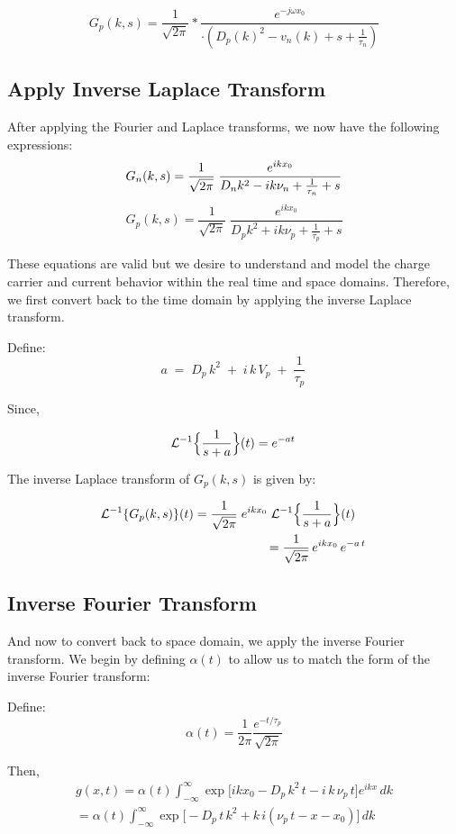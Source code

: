 \documentclass[
  journal,
]{IEEEtran}%
\begin{document}
\[
G_p(k, s) = \frac{1}{\sqrt{2\pi}} * \frac{
e^{-j \omega x_0}}{
\cdot \left(D_p(k)^2
- v_n (k)
+ s
+ \frac{1}{\tau_n}
\right)}
\]

\subsection{Apply Inverse Laplace
Transform}\label{apply-inverse-laplace-transform}

After applying the Fourier and Laplace transforms, we now have the
following expressions: \[
G_n(k,s) = \frac{1}{\sqrt{2\pi}}\;\frac{e^{ikx_0}}{D_n k^2 - i k \nu_n + \frac{1}{\tau_n} + s} \\[1ex]
\] \[
G_p(k,s) = \frac{1}{\sqrt{2\pi}}\;\frac{e^{ikx_0}}{D_p k^2 + i k \nu_p + \frac{1}{\tau_p} + s}
\]

These equations are valid but we desire to understand and model the
charge carrier and current behavior within the real time and space
domains. Therefore, we first convert back to the time domain by applying
the inverse Laplace transform.

Define: \[
a \;=\; D_p\,k^2 \;+\; i\,k\,V_p \;+\; \frac1{\tau_p}\,
\]

Since,

\[
\mathcal{L}^{-1}\Bigl\{\frac1{s+a}\Bigr\}(t)=e^{-a t}\,
\]

The inverse Laplace transform of \(G_p(k,s)\) is given by:

\[
\begin{multlined}
\mathcal{L}^{-1}\{G_p(k,s)\}(t)
=\frac{1}{\sqrt{2\pi}}\;e^{ikx_0}\;\mathcal{L}^{-1}\Bigl\{\frac1{s+a}\Bigr\}(t)
\\
=\frac{1}{\sqrt{2\pi}}\,e^{ikx_0}\,e^{-a\,t}\,
\end{multlined}
\]

\subsection{Inverse Fourier Transform}\label{inverse-fourier-transform}

And now to convert back to space domain, we apply the inverse Fourier
transform. We begin by defining \(\alpha(t)\) to allow us to match the
form of the inverse Fourier transform:

Define: \[
\alpha(t) = \frac{1}{2\pi} \frac{e^{-t/\tau_p}}{\sqrt{2\pi}}
\]

Then, \[
\begin{multlined}
g(x,t)
= \alpha(t)
  \int_{-\infty}^{\infty}
    \exp\bigl[i k x_0 - D_p\,k^2\,t - i\,k\,\nu_p\,t\bigr]
    e^{i k x}\,dk
\\
= \alpha(t)
  \int_{-\infty}^{\infty}
    \exp\bigl[-D_p\,t\,k^2 + k\,i(\nu_p\,t - x - x_0)\bigr]
    \,dk
\end{multlined}
\]
\end{document}

